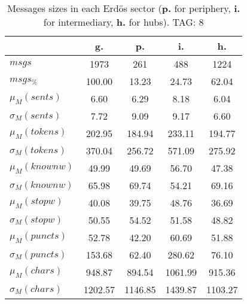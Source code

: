 \begin{table}[h!]
\begin{center}
\begin{tabular}{| l || c | c | c | c |}\hline
 & {\bf g.} & {\bf p.} & {\bf i.} & {\bf h.} \\\hline\hline
$msgs$ & 1973  & 261  & 488  & 1224 \\
$msgs_{\%}$ & 100.00  & 13.23  & 24.73  & 62.04 \\\hline
$\mu_M(sents)$ & 6.60  & 6.29  & 8.18  & 6.04 \\
$\sigma_M(sents)$ & 7.72  & 9.09  & 9.17  & 6.60 \\\hline
$\mu_M(tokens)$ & 202.95  & 184.94  & 233.11  & 194.77 \\
$\sigma_M(tokens)$ & 370.04  & 256.72  & 571.09  & 275.92 \\\hline
$\mu_M(knownw)$ & 49.99  & 49.69  & 56.70  & 47.38 \\
$\sigma_M(knownw)$ & 65.98  & 69.74  & 54.21  & 69.16 \\\hline
$\mu_M(stopw)$ & 40.08  & 39.75  & 48.76  & 36.69 \\
$\sigma_M(stopw)$ & 50.55  & 54.52  & 51.58  & 48.82 \\\hline
$\mu_M(puncts)$ & 52.78  & 42.20  & 60.69  & 51.88 \\
$\sigma_M(puncts)$ & 153.68  & 62.40  & 280.62  & 76.10 \\\hline
$\mu_M(chars)$ & 948.87  & 894.54  & 1061.99  & 915.36 \\
$\sigma_M(chars)$ & 1202.57  & 1146.85  & 1439.87  & 1103.27 \\\hline
\end{tabular}
\caption{Messages sizes in each Erd\"os sector ({{\bf p.}} for periphery, {{\bf i.}} for intermediary, {{\bf h.}} for hubs). TAG: 8}
\end{center}
\end{table}